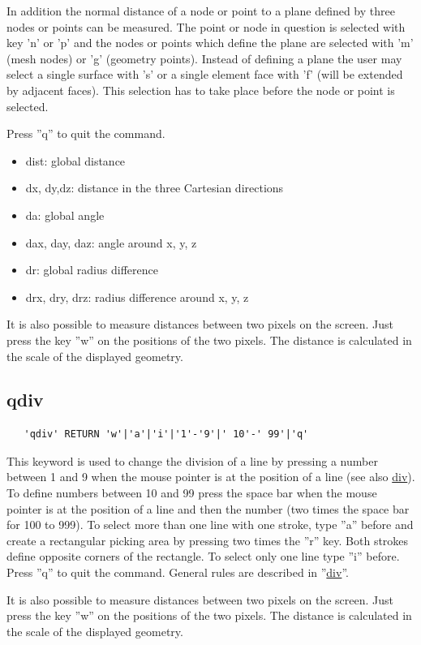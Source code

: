 \documentclass{article}
\providecommand{\htmlref}[2]{\hyperref[#2]{#1}}
\begin{document}
In addition the normal distance of a node or point to a plane defined by three nodes or points can be measured. The point or node in question is selected with key 'n' or 'p' and the nodes or points which define the plane are selected with 'm' (mesh nodes) or 'g' (geometry points). Instead of defining a plane the user may select a single surface with 's' or a single element face with 'f' (will be extended by adjacent faces). This selection has to take place before the node or point is selected.

Press ''q'' to quit the command.

\begin{itemize}
\item dist: global distance
\item dx, dy,dz: distance in the three Cartesian directions
\item da: global angle
\item dax, day, daz: angle around x, y, z
\item dr: global radius difference
\item drx, dry, drz: radius difference around x, y, z
\end{itemize}

It is also possible to measure distances between two pixels on the screen. Just press the key ''w'' on the positions of the two pixels. The distance is calculated in the scale of the displayed geometry.

\subsection{\label{qdiv}qdiv}
\begin{verbatim}
   'qdiv' RETURN 'w'|'a'|'i'|'1'-'9'|' 10'-' 99'|'q' 
\end{verbatim}
This keyword is used to change the division of a line by pressing a number between 1 and 9 when the mouse pointer is at the position of a line (see also \htmlref{div}{div}). To define numbers between 10 and 99 press the space bar when the mouse pointer is at the position of a line and then the number (two times the space bar for 100 to 999). To select more than one line with one stroke, type ''a'' before and create a rectangular picking area by pressing two times the ''r'' key. Both strokes define opposite corners of the rectangle. To select only one line type ''i'' before. Press ''q'' to quit the command. General rules are described in ''\htmlref{div}{div}''. 

It is also possible to measure distances between two pixels on the screen. Just press the key ''w'' on the positions of the two pixels. The distance is calculated in the scale of the displayed geometry.
\end{document}
